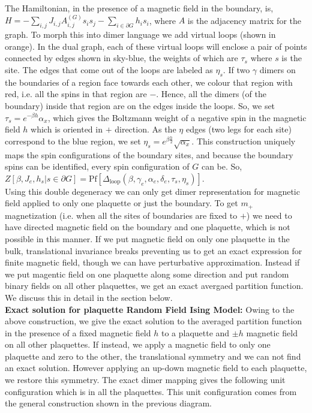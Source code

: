 \documentclass{article}
\begin{document}
	The Hamiltonian, in the presence of a magnetic field in the boundary, is, $H=-\sum_{i,j} J_{i,j}A^{(G)}_{i,j}s_is_j-\sum_{i \in \partial G} h_i s_i $, where $A$ is the adjacency matrix for the graph. To morph this into dimer language we add virtual loops (shown in orange). In the dual graph, each of these virtual loops will enclose a pair of points connected by edges shown in sky-blue, the weights of which are $\tau_s$ where $s$ is the site. The edges that come out of the loops are labeled as $\eta_s$. If two $\gamma$ dimers on the boundaries of a region face towards each other, we colour that region with red, i.e. all the spins in that region are $-$. Hence, all the dimers (of the boundary) inside that region are on the edges inside the loops. So, we set $\tau_s=e^{-\beta h}\alpha_x$, which gives the Boltzmann weight of a negative spin in the magnetic field $h$ which is oriented in $+$ direction. As the $\eta$ edges (two legs for each site)  correspond to the blue region, we set $\eta_s=e^{\beta \frac{h}{2}}\sqrt{\alpha_x}$. This construction uniquely maps the spin configurations of the boundary sites, and because the boundary spins can be identified, every spin configuration of $G$ can be. So, $Z[\beta, J_e, h_s| s\in \partial G]=\text{Pf}[\Delta_{\text{loop}}(\beta, \gamma_e, \alpha_e, \delta_e ,\tau_s, \eta_s)]$.\\
	
	
	Using this double degeneracy we can only get dimer representation for magnetic field applied to only one plaquette or just the boundary. To get $m_{+}$ magnetization (i.e. when all the sites of boundaries are fixed to $+$) we need to have directed magnetic field on the boundary and one plaquette, which is not possible in this manner. If we put magnetic field on only one plaquette in the bulk, translational invariance breaks preventing us to get an exact expression for finite magnetic field, though we can have perturbative approximation. Instead if we put magentic field on one plaquette along some direction and put random binary fields on all other plaquettes, we get an exact avergaed partition function. We discuss this in detail in the section below. \\ 
	
	\textbf{Exact solution for plaquette Random Field Ising Model:} Owing to the above construction, we give the exact solution to the averaged partition function in the presence of a fixed magnetic field $h$ to a plaquette and $\pm h$ magnetic field on all other plaquettes. If instead, we apply a magnetic field to only one plaquette and zero to the other, the translational symmetry and we can not find an exact solution. However applying an up-down magnetic field to each plaquette, we restore this symmetry. The exact dimer mapping gives the following unit configuration which is in all the plaquettes. This unit configuration comes from the general construction shown in the previous diagram.
	
\end{document}
